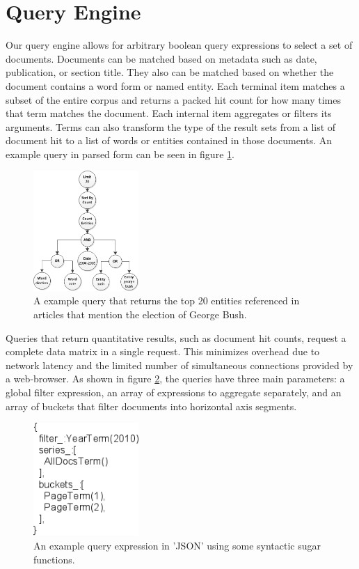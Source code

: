 \section{Query Engine}
Our query engine allows for arbitrary boolean query expressions to select a set of documents.  Documents can be matched based on metadata such as date, publication, or section title. They also can be matched based on whether the document contains a word form or named entity.  Each terminal item matches a subset of the entire corpus and returns a packed hit count for how many times that term matches the document.  Each internal item aggregates or filters its arguments.  Terms can also transform the type of the result sets from a list of document hit to a list of words or entities contained in those documents.  An example query in parsed form can be seen in figure \ref{fig:entity-query}.

\begin{figure}[htb]
  \centerline{
    \includegraphics[width=40mm]{figures/entity-query.png}
  }
  \caption{A example query that returns the top 20 entities referenced in articles that mention the election of George Bush.}
  \label{fig:entity-query}
\end{figure}

Queries that return quantitative results, such as document hit counts, request a complete data matrix in a single request.  This minimizes overhead due to network latency and the limited number of simultaneous connections provided by a web-browser.  As shown in figure \ref{fig:json-query}, the queries have three main parameters: a global filter expression, an array of expressions to aggregate separately, and an array of buckets that filter documents into horizontal axis segments.

\begin{figure}[htb]
  \centerline{
    \includegraphics[width=40mm]{figures/json-query.png}
  }
  \caption{An example query expression in 'JSON' using some syntactic sugar functions.}
  \label{fig:json-query}
\end{figure}

